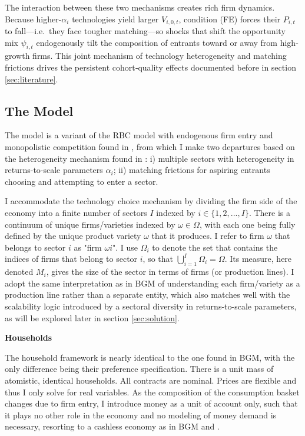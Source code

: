 \documentclass[a4paper,12pt]{article} %
\numberwithin{equation}{section} %
\numberwithin{figure}{section}
\numberwithin{table}{section}
\begin{document}
The interaction between these two mechanisms creates rich firm dynamics. Because higher-$\alpha_i$ technologies yield 
larger $V_{i,0,t}$, condition (FE) forces their $P_{i,t}$ to fall—i.e.\ they face tougher matching—so shocks that 
shift the opportunity mix $\psi_{i,t}$ endogenously tilt the composition of entrants toward or away from high-growth firms. 
This joint mechanism of technology heterogeneity and matching frictions drives the persistent 
cohort‐quality effects documented before in section \ref{sec:literature}. 

\subsection{The Model}
\label{sec:model-mine}

The model is a variant of the RBC model with endogenous firm entry and monopolistic competition found in \textcite{bilbiie2012endogenous}, from which
I make two departures based on the heterogeneity mechanism found in \textcite{sedlavcek2017growth}: i) multiple sectors with heterogeneity in
returns-to-scale parameters $\alpha_i$; ii) matching frictions for aspiring entrants choosing and attempting to enter a sector.

I accommodate the technology choice mechanism by dividing the firm side of the economy into a finite number of sectors $I$ indexed by
$i \in \{1,2,...,I\}$. There is a continuum of unique firms/varieties indexed by $\omega \in \Omega$, with each one being fully defined by 
the unique product variety $\omega$ that it produces. I refer to firm $\omega$ that belongs to sector $i$ as "firm $\omega i$". 
I use $\Omega_i$ to denote the set that contains the indices of firms that belong to sector $i$, so that $\bigcup_{i=1}^{I} \Omega_i = \Omega$. 
Its measure, here denoted $M_{i}$, gives the size of the sector in terms of firms (or production lines). I adopt the same interpretation as in BGM 
of understanding each firm/variety as a production line rather than a separate entity, which also matches well with the scalability logic introduced
by a sectoral diversity in returns-to-scale parameters, as will be explored later in section \ref{sec:solution}.

\medskip
\medskip
\noindent\textbf{Households}
\medskip

The household framework is nearly identical to the one found in BGM, with the only difference being their preference specification. There is a 
unit mass of atomistic, identical households. All contracts are nominal. Prices are flexible and thus I only solve for real variables. As the
composition of the consumption basket changes due to firm entry, I introduce money as a unit of account only, such that it plays no other role in the
economy and no modeling of money demand is necessary, resorting to a cashless economy as in BGM and \textcite{woodford2003interest}.
\end{document}
